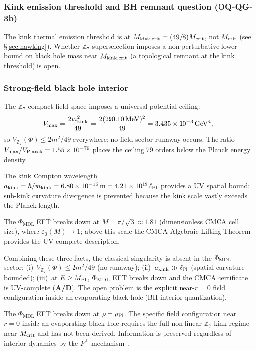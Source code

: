 \documentclass[11pt]{article}
\theoremstyle{remark}
\newcommand{\PHIMDL}{\Phi_{\mathrm{MDL}}}
\newcommand{\ZS}{\mathbb{Z}_7}
\newcommand{\rhoPl}{\rho_{\rm Pl}}
\newcommand{\CatAD}{\textbf{A/D}}
\begin{document}
\subsubsection{Kink emission threshold and BH remnant question (OQ-QG-3b)}

The kink thermal emission threshold is at $M_{\rm kink,crit} = (49/8)M_{\rm crit}$,
not $M_{\rm crit}$ (see \S\ref{sec:hawking}).  Whether $\mathbb{Z}_7$ superselection
imposes a non-perturbative lower bound on black hole mass near $M_{\rm kink,crit}$
(a topological remnant at the kink threshold) is open.

\subsubsection{Strong-field black hole interior}
\label{ssec:openqg}

The $\mathbb{Z}_7$ compact field space imposes a universal potential ceiling:
\begin{equation}
V_{\max} = \frac{2m_{\rm kink}^2}{49} = \frac{2(290.10\,\mathrm{MeV})^2}{49}
= 3.435\times10^{-3}\,\mathrm{GeV}^4,
\end{equation}
so $V_{\ZS}(\Phi)\le 2m^2/49$ everywhere; no field-sector runaway occurs.
The ratio $V_{\max}/V_{\rm Planck} = 1.55\times10^{-79}$ places the ceiling
79 orders below the Planck energy density.

The kink Compton wavelength $a_{\rm kink} = \hbar/m_{\rm kink} = 6.80\times10^{-16}\,\mathrm{m}
= 4.21\times10^{19}\,\ell_{\rm Pl}$ provides a UV spatial bound: sub-kink curvature divergence
is prevented because the kink scale vastly exceeds the Planck length.

The $\PHIMDL$ EFT breaks down at $M = \pi/\sqrt{3} \approx 1.81$ (dimensionless CMCA
cell size), where $\varepsilon_0(M)\to 1$; above this scale the CMCA Algebraic
Lifting Theorem provides the UV-complete description.

Combining these three facts, the classical singularity is absent in the $\Phi_{\rm MDL}$ sector:
(i)~$V_{\ZS}(\Phi)\le 2m^2/49$ (no runaway); (ii)~$a_{\rm kink}\gg\ell_{\rm Pl}$
(spatial curvature bounded); (iii)~at $E\ge M_{\rm Pl}$, $\Phi_{\rm MDL}$ EFT breaks down
and the CMCA certificate is UV-complete (\CatAD).
The open problem is the explicit near-$r=0$ field configuration inside an evaporating
black hole (BH interior quantization).

The $\PHIMDL$ EFT breaks down at $\rho=\rhoPl$.  The specific field configuration
near $r=0$ inside an evaporating black hole requires the full non-linear $\ZS$-kink
regime near $M_{\rm crit}$ and has not been derived.  Information is preserved
regardless of interior dynamics by the $P^\top$
mechanism~\cite{SpivackBHUnitarity,SpivackPolynomialTransputation}.
\end{document}
